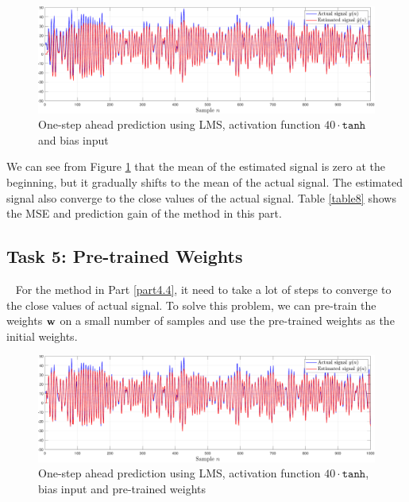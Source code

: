 \documentclass[10pt]{article}
\begin{document}
\begin{figure}[htbp]
    \centering
	\includegraphics[width=1\textwidth]{fig/4.4_1.pdf}

    \caption{One-step ahead prediction using LMS, activation function $ 40 \cdot \mathtt{tanh}$ and bias input}
    \label{fig30}
\end{figure}

We can see from Figure \ref{fig30} that the mean of the estimated signal is zero at the beginning, but
it gradually shifts to the mean of the actual signal. The estimated signal also converge to the close values 
of the actual signal. Table \ref{table8} shows the MSE and prediction gain of the 
method in this part.

\begin{table}[H]
	\caption{Bias input for time-series with non-zero mean}
	\centering
\end{table}


\subsection{Task 5: Pre-trained Weights}
\ \indent
For the method in Part \ref{part4.4}, it need to take a lot of steps to converge to 
the close values of actual signal. To solve this problem, we can pre-train the weights
${\bf{w}}$ on a small number of samples and use the pre-trained weights as the initial weights.

\begin{figure}[htbp]
    \centering
	\includegraphics[width=1\textwidth]{fig/4.5_1.pdf}

    \caption{One-step ahead prediction using LMS, activation function $ 40 \cdot \mathtt{tanh}$, bias input and pre-trained weights}
    \label{fig31}
\end{figure}
\end{document}

